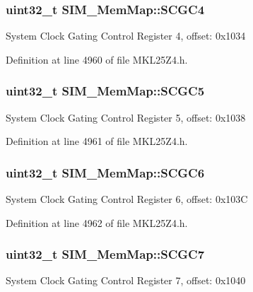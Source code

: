 \subsubsection[{\texorpdfstring{S\+C\+G\+C4}{SCGC4}}]{\setlength{\rightskip}{0pt plus 5cm}uint32\+\_\+t S\+I\+M\+\_\+\+Mem\+Map\+::\+S\+C\+G\+C4}\hypertarget{struct_s_i_m___mem_map_a96c123ab70356a131990c9ae3812834e}{}\label{struct_s_i_m___mem_map_a96c123ab70356a131990c9ae3812834e}
System Clock Gating Control Register 4, offset\+: 0x1034 

Definition at line 4960 of file M\+K\+L25\+Z4.\+h.

\subsubsection[{\texorpdfstring{S\+C\+G\+C5}{SCGC5}}]{\setlength{\rightskip}{0pt plus 5cm}uint32\+\_\+t S\+I\+M\+\_\+\+Mem\+Map\+::\+S\+C\+G\+C5}\hypertarget{struct_s_i_m___mem_map_ae9d560d3862eb171c739acaf92daa8aa}{}\label{struct_s_i_m___mem_map_ae9d560d3862eb171c739acaf92daa8aa}
System Clock Gating Control Register 5, offset\+: 0x1038 

Definition at line 4961 of file M\+K\+L25\+Z4.\+h.

\subsubsection[{\texorpdfstring{S\+C\+G\+C6}{SCGC6}}]{\setlength{\rightskip}{0pt plus 5cm}uint32\+\_\+t S\+I\+M\+\_\+\+Mem\+Map\+::\+S\+C\+G\+C6}\hypertarget{struct_s_i_m___mem_map_ad40dd833ac37056f5341b692039a5f10}{}\label{struct_s_i_m___mem_map_ad40dd833ac37056f5341b692039a5f10}
System Clock Gating Control Register 6, offset\+: 0x103C 

Definition at line 4962 of file M\+K\+L25\+Z4.\+h.

\subsubsection[{\texorpdfstring{S\+C\+G\+C7}{SCGC7}}]{\setlength{\rightskip}{0pt plus 5cm}uint32\+\_\+t S\+I\+M\+\_\+\+Mem\+Map\+::\+S\+C\+G\+C7}\hypertarget{struct_s_i_m___mem_map_aa35362a8c756eedb82b8cf00f98c43da}{}\label{struct_s_i_m___mem_map_aa35362a8c756eedb82b8cf00f98c43da}
System Clock Gating Control Register 7, offset\+: 0x1040 

